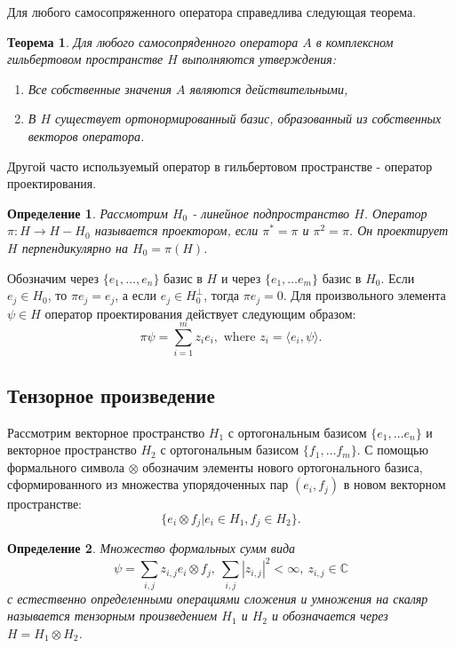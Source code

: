 \documentclass[11pt]{article}
\newtheorem{theorem}{Теорема}[section]
\newtheorem{definition}{Определение}[section]
\begin{document}
Для любого самосопряженного оператора справедлива следующая теорема. 
\begin{theorem}
Для любого самосопряденного оператора $A$ в комплексном гильбертовом пространстве $H$ выполняются утверждения:
\begin{enumerate}
\item Все собственные значения $A$ являются действительными,
\item В $H$ существует ортонормированный базис, образованный из собственных векторов оператора.
\end{enumerate}
\end{theorem}

Другой часто используемый оператор в гильбертовом пространстве - оператор проектирования.
\begin{definition}
Рассмотрим $H_0$ - линейное подпространство $H$. Оператор $\pi: H \to H - H_0$ называется проектором, если $\pi^* = \pi$ и $\pi^2 = \pi$. Он проектирует $H$ перпендикулярно на $H_0 = \pi(H)$.
\end{definition}
Обозначим через $\{e_1, \ldots, e_n\}$ базис в $H$ и через $\{e_1, \ldots e_m\}$ базис в $H_0$. Если $e_j \in H_0$, то $\pi e_j = e_j$, а если $e_j\in H_0^\perp$, тогда $\pi e_j = 0$. Для произвольного элемента $\psi\in H$ оператор проектирования действует следующим образом: 
\[
\pi\psi = \sum_{i = 1}^m z_ie_i, \mbox{ where } z_i = \langle e_i, \psi\rangle.
\]

\subsection{Тензорное произведение}
Рассмотрим векторное пространство $H_1$ с ортогональным базисом $\{e_1, \ldots e_n\}$ и векторное пространство $H_2$ с ортогональным базисом $\{f_1,\ldots f_m\}$. С помощью формального символа $\otimes$ обозначим элементы нового ортогонального базиса, сформированного из множества упорядоченных пар $(e_i, f_j)$ в новом векторном пространстве:
\begin{equation}
\{e_i \otimes f_j | e_i \in H_1, f_j \in H_2\}. \label{eq:tensor_basis}
\end{equation}

\begin{definition}
Множество формальных сумм вида
\begin{equation}
\psi = \sum_{i,j}z_{i,j}e_i\otimes f_j,\ \sum_{i, j}|z_{i,j}|^2 < \infty,\  z_{i,j} \in \mathbb{C}
\label{eq:tensor_element}
\end{equation}
с естественно определенными операциями сложения и умножения на скаляр называется тензорным произведением $H_1$ и $H_2$ и обозначается через $H = H_1\otimes H_2$.
\end{definition}
\end{document}
